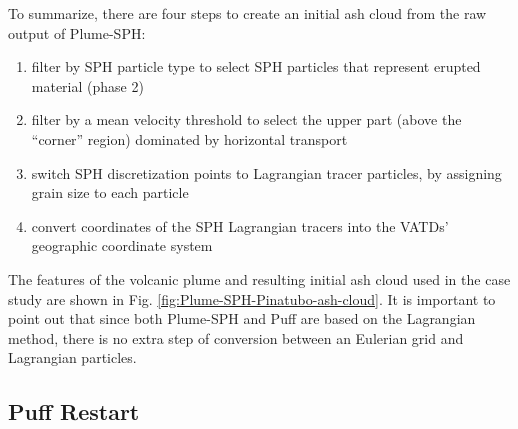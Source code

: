 \documentclass[utf8]{frontiersSCNS} %
\begin{document}
To summarize, there are four steps to create an initial ash cloud from the raw output of Plume-SPH:
\begin{enumerate}
\item filter by SPH particle type to select SPH particles that represent erupted material (phase 2)
\item filter by a mean velocity threshold to select the upper part (above the ``corner'' region) dominated by horizontal transport
\item switch SPH discretization points to Lagrangian tracer particles, by assigning grain size to each particle
\item convert coordinates of the SPH Lagrangian tracers into the VATDs' geographic coordinate system
\end{enumerate}
The features of the volcanic plume and resulting initial ash cloud used in the case study are shown in Fig. \ref{fig:Plume-SPH-Pinatubo-ash-cloud}. It is important to point out that since both Plume-SPH and Puff are based on the Lagrangian method, there is no extra step of conversion between an Eulerian grid and Lagrangian particles.


\subsection{Puff Restart}
\end{document}
